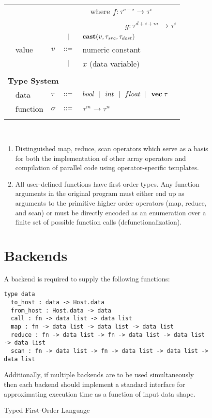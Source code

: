 \documentclass[preprint]{sigplanconf}
\begin{document}
\begin{figure}[h!]
\begin{tabular}{| m{0.01cm}m{1.3cm}m{0.1cm}m{0.2cm}p{5.0cm} |}
  &            &     &           & ~~\small{where $f : \tau^{c+i} \rightarrow \tau^i$} \\[1.5pt]
  &            &     &           & ~~~~~~~~~~~\small{$g : \tau^{d + i + m } \rightarrow \tau^i$} \\[2pt]
  &            &     & $\ \ | \ \ $    & $\mbox{\textbf{cast}} (v, \tau_{src}, \tau_{dest})$ \\[5pt]
  & value      & $v$ & $::=$ & numeric constant\\[2pt]
  &            &     & $\ \ | \ \ $    &  $x$  \quad \small{(data variable)} \\[5pt]
  & & & &\\
  \multicolumn{5}{|l|}{\textbf{Type System}} \\[4pt]
  & data & $\tau$    & $::=$ & $bool \ \ | \ \  int \ \ | \ \  float \ \ | \ \  \mathbf{vec} \; \tau   $ \\[2pt]
  & function & $\sigma$ & $::=$ & $\tau^m \rightarrow \tau^n$ \\[4pt]
  & & & &\\
  \hline
  \end{tabular}\\[4pt]
\caption{Typed First-Order Language}

\begin{enumerate}
\item Distinguished map, reduce, scan operators which serve as a basis for both the implementation of other array 
 operators and compilation of parallel code using operator-specific templates.  
\item All user-defined functions have first order types. Any function arguments in the original program 
 must either end up as arguments to the primitive higher order operators (map, reduce, and scan) or
 must be directly encoded as an enumeration over a finite set of possible function calls (defunctionalization). 
\end{enumerate}

\section{Backends} 
A backend is required to supply the following functions: 
\begin{lstlisting}[numbers=none]
  type data
  to_host : data -> Host.data
  from_host : Host.data -> data
  call : fn -> data list -> data list
  map : fn -> data list -> data list -> data list 
  reduce : fn -> data list -> fn -> data list -> data list -> data list
  scan : fn -> data list -> fn -> data list -> data list -> data list 
\end{lstlisting}
Additionally, if multiple backends are to be used simultaneously then each backend should implement a standard interface for approximating
execution time as a function of input data shape. 

\end{figure}
\end{document}
